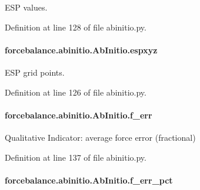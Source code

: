E\-S\-P values. 



Definition at line 128 of file abinitio.\-py.

\hypertarget{classforcebalance_1_1abinitio_1_1AbInitio_a8be2d088afb344036aae989ca3cbcc41}{
\paragraph[{espxyz}]{\setlength{\rightskip}{0pt plus 5cm}forcebalance.\-abinitio.\-Ab\-Initio.\-espxyz\hspace{0.3cm}{\ttfamily [inherited]}}}\label{classforcebalance_1_1abinitio_1_1AbInitio_a8be2d088afb344036aae989ca3cbcc41}


E\-S\-P grid points. 



Definition at line 126 of file abinitio.\-py.

\hypertarget{classforcebalance_1_1abinitio_1_1AbInitio_a176fb2b013ecc5ab451fd3b190414c4d}{
\paragraph[{f\-\_\-err}]{\setlength{\rightskip}{0pt plus 5cm}forcebalance.\-abinitio.\-Ab\-Initio.\-f\-\_\-err\hspace{0.3cm}{\ttfamily [inherited]}}}\label{classforcebalance_1_1abinitio_1_1AbInitio_a176fb2b013ecc5ab451fd3b190414c4d}


Qualitative Indicator\-: average force error (fractional) 



Definition at line 137 of file abinitio.\-py.

\hypertarget{classforcebalance_1_1abinitio_1_1AbInitio_ab6ee932ad4689f538c746310939dd0bc}{
\paragraph[{f\-\_\-err\-\_\-pct}]{\setlength{\rightskip}{0pt plus 5cm}forcebalance.\-abinitio.\-Ab\-Initio.\-f\-\_\-err\-\_\-pct\hspace{0.3cm}{\ttfamily [inherited]}}}\label{classforcebalance_1_1abinitio_1_1AbInitio_ab6ee932ad4689f538c746310939dd0bc}



